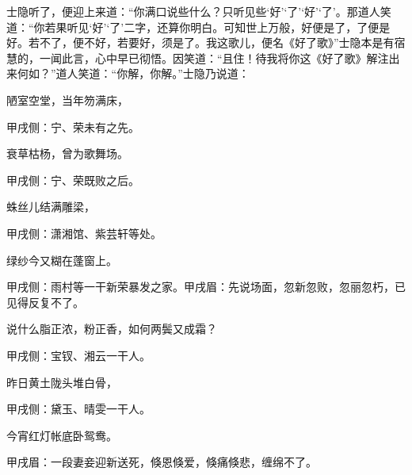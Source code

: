 \begin{parag}
    士隐听了，便迎上来道：“你满口说些什么？只听见些‘好’‘了’‘好’‘了’。那道人笑道：“你若果听见‘好’‘了’二字，还算你明白。可知世上万般，好便是了，了便是好。若不了，便不好，若要好，须是了。我这歌儿，便名《好了歌》”士隐本是有宿慧的，一闻此言，心中早已彻悟。因笑道：“且住！待我将你这《好了歌》解注出来何如？”道人笑道：“你解，你解。”士隐乃说道：
\end{parag}


\begin{poem}
    \begin{pl}陋室空堂，当年笏满床，\end{pl}\begin{note}甲戌侧：宁、荣未有之先。\end{note}

    \begin{pl}衰草枯杨，曾为歌舞场。\end{pl}\begin{note}甲戌侧：宁、荣既败之后。\end{note}

    \begin{pl}蛛丝儿结满雕梁，\end{pl}\begin{note}甲戌侧：潇湘馆、紫芸轩等处。\end{note}

    \begin{pl}绿纱今又糊在蓬窗上。\end{pl}\begin{note}甲戌侧：雨村等一干新荣暴发之家。甲戌眉：先说场面，忽新忽败，忽丽忽朽，已见得反复不了。\end{note}

    \begin{pl}说什么脂正浓，粉正香，如何两鬓又成霜？\end{pl}\begin{note}甲戌侧：宝钗、湘云一干人。\end{note}

    \begin{pl}昨日黄土陇头堆白骨，\end{pl}\begin{note}甲戌侧：黛玉、晴雯一干人。\end{note}

    \begin{pl}今宵红灯帐底卧鸳鸯。\end{pl}\begin{note}甲戌眉：一段妻妾迎新送死，倏恩倏爱，倏痛倏悲，缠绵不了。\end{note}


\end{poem}
